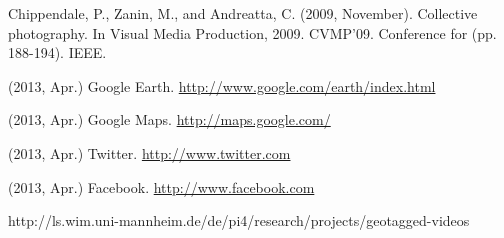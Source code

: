 \documentclass[journal]{IEEEtran}
\begin{document}
\begin{thebibliography}{1}
Chippendale, P., Zanin, M., and Andreatta, C. (2009, November). Collective photography. In Visual Media Production, 2009. CVMP'09. Conference for (pp. 188-194). IEEE.

(2013, Apr.) Google Earth. \url{http://www.google.com/earth/index.html}

(2013, Apr.) Google Maps. \url{http://maps.google.com/}

(2013, Apr.) Twitter. \url{http://www.twitter.com}

(2013, Apr.) Facebook. \url{http://www.facebook.com}

http://ls.wim.uni-mannheim.de/de/pi4/research/projects/geotagged-videos




\end{thebibliography}



% 










\end{document}
